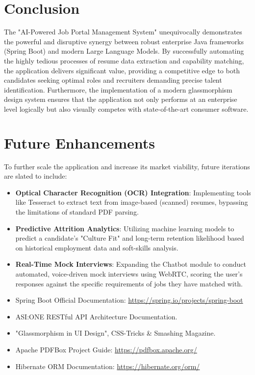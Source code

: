 \documentclass[12pt]{report}
\begin{document}
\section{Conclusion} 
The "AI-Powered Job Portal Management System" unequivocally demonstrates the powerful and disruptive synergy between robust enterprise Java frameworks (Spring Boot) and modern Large Language Models. By successfully automating the highly tedious processes of resume data extraction and capability matching, the application delivers significant value, providing a competitive edge to both candidates seeking optimal roles and recruiters demanding precise talent identification. Furthermore, the implementation of a modern glassmorphism design system ensures that the application not only performs at an enterprise level logically but also visually competes with state-of-the-art consumer software.

\section{Future Enhancements} 
To further scale the application and increase its market viability, future iterations are slated to include:
\begin{itemize}
    \item \textbf{Optical Character Recognition (OCR) Integration}: Implementing tools like Tesseract to extract text from image-based (scanned) resumes, bypassing the limitations of standard PDF parsing.
    \item \textbf{Predictive Attrition Analytics}: Utilizing machine learning models to predict a candidate's "Culture Fit" and long-term retention likelihood based on historical employment data and soft-skills analysis.
    \item \textbf{Real-Time Mock Interviews}: Expanding the Chatbot module to conduct automated, voice-driven mock interviews using WebRTC, scoring the user's responses against the specific requirements of jobs they have matched with.
\end{itemize}

\renewcommand\bibname{References} 

\begin{itemize}
    \item Spring Boot Official Documentation: \url{https://spring.io/projects/spring-boot}
    \item ASI:ONE RESTful API Architecture Documentation.
    \item "Glassmorphism in UI Design", CSS-Tricks \& Smashing Magazine.
    \item Apache PDFBox Project Guide: \url{https://pdfbox.apache.org/}
    \item Hibernate ORM Documentation: \url{https://hibernate.org/orm/}
\end{itemize}
\end{document}
